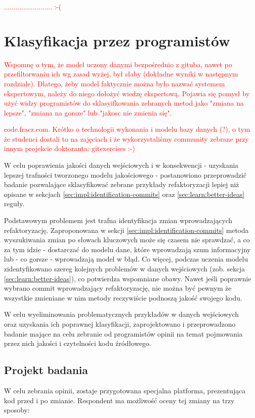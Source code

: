 \documentclass[12pt]{report}
\begin{document}
\textcolor{red}{......................... :-(}

\section{Klasyfikacja przez programistów}
\label{sec:impl:codefracz}
\textcolor{red}{Wspomnę o tym, że model uczony danymi bezpośrednio z gituba, nawet po przefiltorwaniu ich wg zasad wyżej, był słaby (dokładne wyniki w następnym rozdziale). Dlatego, żeby model faktycznie można było nazwać systemem ekspertowym, należy do niego dołożyć wiedzę ekspertową. Pojawia się pomysł by użyć widzy programistów do sklasyifkowania zebranych metod jako "zmiana na lepsze", "zmiana na gorsze" lub "jakosc nie zmienia się".}


\textcolor{red}{code.fracz.com. Krótko o technologii wykonania i modelu bazy danych (?), o tym że studenci dostali to na zajęciach i że wykorzystaliśmy community zebrane przy innym projekcie doktoranta: gitexercises :-) }

W celu poprawienia jakości danych wejściowych i w konsekwencji - uzyskania lepszej trafności tworzonego modelu jakościowego - postanowiono przeprowadzić badanie pozwalające sklasyfikować zebrane przykłady refaktoryzacji lepiej niż opisane w sekcjach \ref{sec:impl:identification-commits} oraz \ref{sec:learn:better-ideas} reguły. 

Podstawowym problemem jest trafna identyfikacja zmian wprowadzających refaktoryzację. Zaproponowana w sekcji \ref{sec:impl:identification-commits} metoda wyszukiwania zmian po słowach kluczowych może się czasem nie sprawdzać, a co za tym idzie - dostarczać do modelu dane, które wprowadzają szum informacyjny lub - co gorsze - wprowadzają model w błąd. Co więcej, podczas uczenia modelu zidentyfikowano szereg kolejnych problemów w danych wejściowych (zob. sekcja \ref{sec:learn:better-ideas}), co potwierdza wspomniane obawy. Nawet jeśli poprawnie wybrano commit wprowadzający refaktoryzację, nie można być pewnym że wszystkie zmieniane w nim metody reczywiście podnoszą jakość swojego kodu.

W celu wyeliminowania problematycznych przykładów w danych wejściowych oraz uzyskania ich poprawnej klasyfikacji, zaprojektowano i przeprowadzono badanie mające na celu zebranie od programistów opinii na temat pojmowania przez nich jakości i czytelności kodu źródłowego.

\subsection{Projekt badania}
\label{sec:impl:codefracz-project}
W celu zebrania opinii, zostaje przygotowana specjalna platforma, prezentująca kod przed i po zmianie. Respondent ma możliwość oceny tej zmiany na trzy sposoby:
\end{document}
